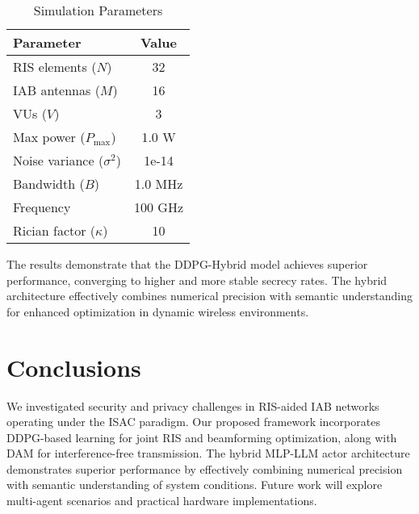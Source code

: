 \documentclass[journal]{IEEEtran}
\begin{document}
\begin{table}[h!]
\centering
\caption{Simulation Parameters}
\begin{tabular}{|l|c|}
\hline
\textbf{Parameter} & \textbf{Value} \\
\hline
RIS elements ($N$) & 32 \\
IAB antennas ($M$) & 16 \\
VUs ($V$) & 3 \\
Max power ($P_{\max}$) & 1.0 W \\
Noise variance ($\sigma^2$) & 1e-14 \\
Bandwidth ($B$) & 1.0 MHz \\
Frequency & 100 GHz \\
Rician factor ($\kappa$) & 10 \\
\hline
\end{tabular}
\end{table}

The results demonstrate that the DDPG-Hybrid model achieves superior performance, converging to higher and more stable secrecy rates. The hybrid architecture effectively combines numerical precision with semantic understanding for enhanced optimization in dynamic wireless environments.

\section{Conclusions}

We investigated security and privacy challenges in RIS-aided IAB networks operating under the ISAC paradigm. Our proposed framework incorporates DDPG-based learning for joint RIS and beamforming optimization, along with DAM for interference-free transmission. The hybrid MLP-LLM actor architecture demonstrates superior performance by effectively combining numerical precision with semantic understanding of system conditions. Future work will explore multi-agent scenarios and practical hardware implementations.
\end{document}
